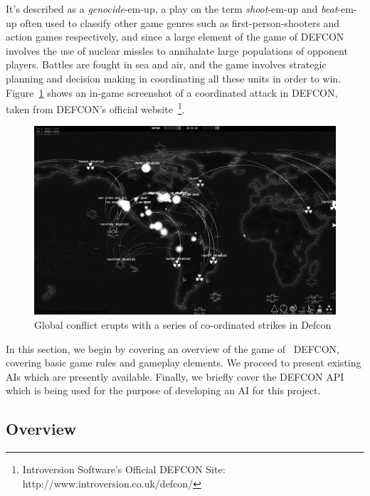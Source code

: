         It's described as a \emph{genocide}-em-up, a play on the term \emph{shoot}-em-up and \emph{beat}-em-up often used to classify other game genres such as first-person-shooters and action games respectively, and since a large element of the game of DEFCON involves the use of nuclear missles to annihalate large populations of opponent players. Battles are fought in sea and air, and the game involves strategic planning and decision making in coordinating all these units in order to win. Figure~\ref{img:defconss} shows an in-game screenshot of a coordinated attack in DEFCON, taken from DEFCON's official website~\footnote{Introversion Software's Official DEFCON Site: http://www.introversion.co.uk/defcon/}.
        
        \begin{figure}[htp]
            \begin{center}
            \includegraphics[scale=0.2]{images/defconss.jpg}
            \caption{Global conflict erupts with a series of co-ordinated strikes in Defcon}
            \label{img:defconss}
            \end{center} 
        \end{figure}
        
        In this section, we begin by covering an overview of the game of ~DEFCON, covering basic game rules and gameplay elements.  We proceed to present existing AIs which are presently available. Finally, we briefly cover the DEFCON API which is being used for the purpose of developing an AI for this project.
              
        
        \subsection{Overview}       
        
